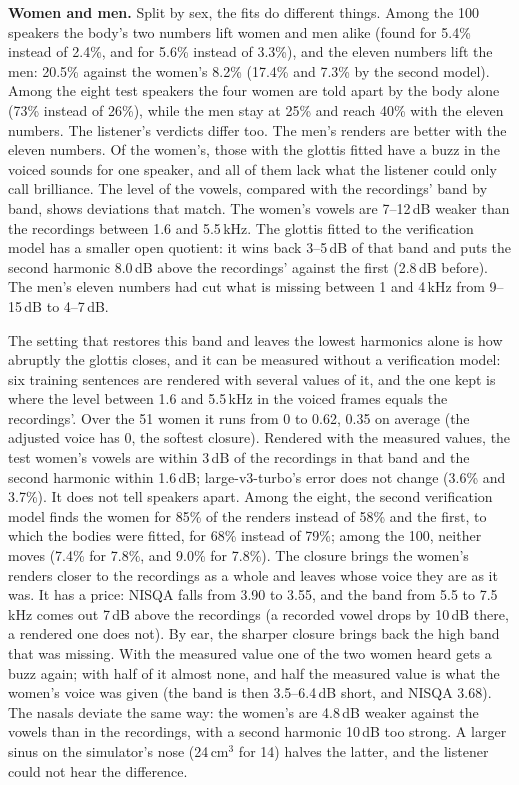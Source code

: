 \documentclass[10pt,a4paper,twocolumn]{article}
\begin{document}
\textbf{Women and men.} Split by sex, the fits do different things. Among the 100 speakers the
body's two numbers lift women and men alike (found for 5.4\% instead of 2.4\%, and for 5.6\%
instead of 3.3\%), and the eleven numbers lift the men: 20.5\% against the women's 8.2\%
(17.4\% and 7.3\% by the second model). Among the eight test speakers the four women are
told apart by the body alone (73\% instead of 26\%), while the men stay at 25\% and reach
40\% with the eleven numbers. The listener's verdicts differ too. The men's renders are better with the
eleven numbers. Of the women's, those with the glottis fitted have a buzz in the voiced sounds for
one speaker, and all of them lack what the listener could only call brilliance. The level of the
vowels, compared with the recordings' band by band, shows deviations that match. The women's
vowels are 7--12\,dB weaker than the recordings between 1.6 and 5.5\,kHz. The glottis fitted to
the verification model has a smaller open quotient: it wins back 3--5\,dB of that band and puts
the second harmonic 8.0\,dB above the recordings' against the first (2.8\,dB before). The men's
eleven numbers had cut what is missing between 1 and 4\,kHz from 9--15\,dB to 4--7\,dB.

The setting that restores this band and leaves the lowest harmonics alone is how abruptly the
glottis closes, and it can be measured without a verification model: six training sentences are
rendered with several values of it, and the one kept is where the level between 1.6 and 5.5\,kHz
in the voiced frames equals the recordings'. Over the 51 women it runs from 0 to 0.62, 0.35 on
average (the adjusted voice has 0, the softest closure). Rendered with the measured values, the
test women's vowels are within 3\,dB of the recordings in that band and the second harmonic within
1.6\,dB; large-v3-turbo's error does not change (3.6\% and 3.7\%). It does not tell speakers
apart. Among the eight, the second verification model finds the women for 85\% of the renders
instead of 58\% and the first, to which the bodies were fitted, for 68\% instead of 79\%; among
the 100, neither moves (7.4\% for 7.8\%, and 9.0\% for 7.8\%). The closure brings the women's
renders closer to the recordings as a whole and leaves whose voice they are as it was. It has a
price: NISQA falls from 3.90 to 3.55, and the band from
5.5 to 7.5\,kHz comes out 7\,dB above the recordings (a recorded vowel drops by 10\,dB there, a
rendered one does not). By ear, the sharper closure brings back the high band that was missing. With the measured value
one of the two women heard gets a buzz again; with half of it almost none, and half the measured
value is what the women's voice was given (the band is then 3.5--6.4\,dB short, and NISQA 3.68). The nasals
deviate the same way: the women's are 4.8\,dB weaker against the vowels than in the recordings,
with a second harmonic 10\,dB too strong. A larger sinus on the simulator's nose (24\,cm$^3$ for
14) halves the latter, and the listener could not hear the difference.
\end{document}
